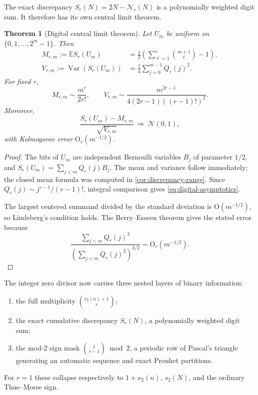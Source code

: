\documentclass[11pt,a4paper]{article}
\theoremstyle{frontier}
\newtheorem{theorem}{Theorem}[section]
\theoremstyle{definition}
\newcommand{\Var}{\operatorname{Var}}
\newcommand{\E}{\mathbb E}
\newcommand{\bigO}{\mathrm O}
\begin{document}
The exact discrepancy $S_r(N)=2N-\mathcal N_r(N)$ is a polynomially weighted digit sum.  It therefore has its own central limit theorem.

\begin{theorem}[Digital central limit theorem]\label{thm:digital-clt}
Let $U_m$ be uniform on $\{0,1,\ldots,2^m-1\}$.  Then
\begin{align}
 M_{r,m}:=\E S_r(U_m)
 &=\frac12\left(\sum_{\ell=1}^{r}\binom{m+1}{\ell}-1\right),\label{eq:digital-mean}\\
 V_{r,m}:=\Var(S_r(U_m))
 &=\frac14\sum_{j=0}^{m-1}Q_r(j)^2.\label{eq:digital-var}
\end{align}
For fixed $r$,
\begin{equation}\label{eq:digital-asymptotics}
 M_{r,m}\sim\frac{m^r}{2r!},
 \qquad
 V_{r,m}\sim
 \frac{m^{2r-1}}{4(2r-1)((r-1)!)^2}.
\end{equation}
Moreover,
\begin{equation}\label{eq:digital-clt}
 \frac{S_r(U_m)-M_{r,m}}{\sqrt{V_{r,m}}}
 \ \Longrightarrow\ \mathcal N(0,1),
\end{equation}
with Kolmogorov error $\bigO_r(m^{-1/2})$.
\end{theorem}

\begin{proof}
The bits of $U_m$ are independent Bernoulli variables $B_j$ of parameter $1/2$, and
$S_r(U_m)=\sum_{j<m}Q_r(j)B_j$.  The mean and variance follow immediately; the closed mean formula was computed in \cref{cor:discrepancy-range}.  Since
$Q_r(j)\sim j^{r-1}/(r-1)!$, integral comparison gives \eqref{eq:digital-asymptotics}.

The largest centered summand divided by the standard deviation is $\bigO(m^{-1/2})$, so Lindeberg's condition holds.  The Berry--Esseen theorem \cite{feller} gives the stated error because
\[
 \frac{\sum_{j<m}Q_r(j)^3}{\left(\sum_{j<m}Q_r(j)^2\right)^{3/2}}
 =\bigO_r(m^{-1/2}).
\]
\end{proof}

\begin{resultbox}
The integer zero divisor now carries three nested layers of binary information:
\begin{enumerate}[label=\arabic*.]
\item the full multiplicity $\binom{\nu_2(n)+1}{r}$;
\item the exact cumulative discrepancy $S_r(N)$, a polynomially weighted digit sum;
\item the mod-$2$ sign mask $\binom j{r-1}\bmod2$, a periodic row of Pascal's triangle generating an automatic sequence and exact Prouhet partitions.
\end{enumerate}
For $r=1$ these collapse respectively to $1+\nu_2(n)$, $s_2(N)$, and the ordinary Thue--Morse sign.
\end{resultbox}
\end{document}
